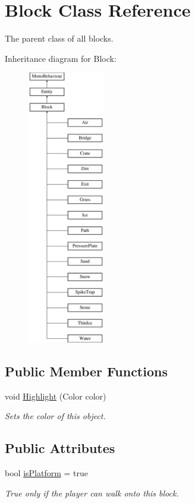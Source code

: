 \hypertarget{class_block}{}\section{Block Class Reference}
\label{class_block}


The parent class of all blocks.  


Inheritance diagram for Block\+:\begin{figure}[H]
\begin{center}
\leavevmode
\includegraphics[height=12.000000cm]{class_block}
\end{center}
\end{figure}
\subsection*{Public Member Functions}
\begin{DoxyCompactItemize}
\item 
void \mbox{\hyperlink{class_block_a2a05ee429ccb968fdc5ec266b5d6b637}{Highlight}} (Color color)
\begin{DoxyCompactList}\small\item\em Sets the color of this object. \end{DoxyCompactList}\end{DoxyCompactItemize}
\subsection*{Public Attributes}
\begin{DoxyCompactItemize}
\item 
bool \mbox{\hyperlink{class_block_ab00076784ce640640411d2cb40bbb7ab}{is\+Platform}} = true
\begin{DoxyCompactList}\small\item\em True only if the player can walk onto this block. \end{DoxyCompactList}\end{DoxyCompactItemize}
